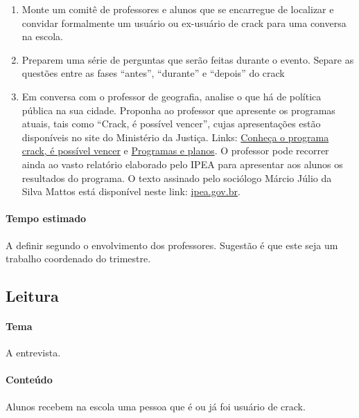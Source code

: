 \documentclass[12pt]{extarticle}
\begin{document}
\begin{enumerate}
	\item Monte um comitê de professores e alunos que se encarregue de 
	localizar e convidar formalmente um usuário ou ex-usuário de crack 
	para uma conversa na escola.
	\item Preparem uma série de perguntas que serão feitas durante 
	o evento. Separe as questões entre as fases ``antes'', ``durante'' 
	e ``depois'' do crack
	\item Em conversa com o professor de geografia, analise o que há de 
	política pública na sua cidade. Proponha ao professor que apresente 
	os programas atuais, tais como ``Crack, é possível vencer'', cujas
	apresentações estão disponíveis no site do Ministério da Justiça. Links:
	\href{https://www.justica.gov.br/news/conheca-o-programa-crack-e-possivel-vencer}%
	{Conheça o programa crack, é possível vencer} e 
	\href{https://www.justica.gov.br/programas-e-planos/crack#:~:text=O%20Crack%2C%20%C3%A9%20poss%C3%ADvel%20vencer,%3A%20preven%C3%A7%C3%A3o%2C%20cuidado%20e%20autoridade.}{Programas e planos}.
	O professor pode recorrer ainda ao vasto relatório elaborado pelo IPEA para 
	apresentar aos alunos os resultados do programa. O texto assinado 
	pelo sociólogo Márcio Júlio da Silva Mattos está disponível 
	neste link: \href{https://www.ipea.gov.br/ppp/index.php/PPP/article/view/683}{ipea.gov.br}.
\end{enumerate}


\paragraph{Tempo estimado} A definir segundo o envolvimento dos professores. Sugestão é que 
	este seja um trabalho coordenado do trimestre. 

\subsection{Leitura}

\paragraph{Tema} A entrevista.

\paragraph{Conteúdo} Alunos recebem na escola uma pessoa que é ou já foi usuário de crack.
\end{document}
